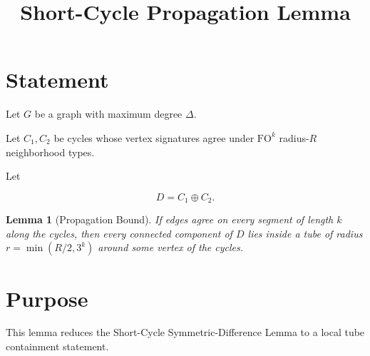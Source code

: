 \documentclass[11pt]{article}
\title{Short-Cycle Propagation Lemma}
\date{}
\newtheorem{lemma}{Lemma}
\begin{document}
\maketitle

\section*{Statement}

Let \(G\) be a graph with maximum degree \(\Delta\).

Let \(C_1,C_2\) be cycles whose vertex signatures agree under
\(\mathrm{FO}^k\) radius-\(R\) neighborhood types.

Let

\[
D = C_1 \oplus C_2 .
\]

\begin{lemma}[Propagation Bound]

If edges agree on every segment of length \(k\) along the cycles,
then every connected component of \(D\) lies inside a tube of
radius \(r=\min(R/2,3^k)\) around some vertex of the cycles.

\end{lemma}

\section*{Purpose}

This lemma reduces the Short-Cycle Symmetric-Difference Lemma to a
local tube containment statement.
\end{document}
